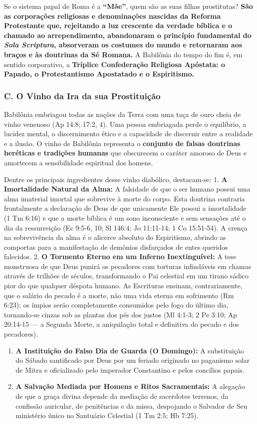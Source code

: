 Se o sistema papal de Roma é a \textbf{``Mãe''}, quem são as suas filhas prostitutas? \textbf{São as corporações religiosas e denominações nascidas da Reforma Protestante que, rejeitando a luz crescente da verdade bíblica e o chamado ao arrependimento, abandonaram o princípio fundamental do \textit{Sola Scriptura}, absorveram os costumes do mundo e retornaram aos braços e às doutrinas da Sé Romana.} A Babilônia do tempo do fim é, em sentido corporativo, a \textbf{Tríplice Confederação Religiosa Apóstata: o Papado, o Protestantismo Apostatado e o Espiritismo.}


\subsubsection*{C. O Vinho da Ira da sua Prostituição}

Babilônia embriagou todas as nações da Terra com uma taça de ouro cheia de vinho venenoso (Ap 14:8; 17:2, 4). Uma pessoa embriagada perde o equilíbrio, a lucidez mental, o discernimento ético e a capacidade de discernir entre a realidade e a ilusão. O vinho de Babilônia representa o \textbf{conjunto de falsas doutrinas heréticas e tradições humanas} que obscurecem o caráter amoroso de Deus e amortecem a sensibilidade espiritual dos homens.

Dentre os principais ingredientes desse vinho diabólico, destacam-se:
1. \textbf{A Imortalidade Natural da Alma:} A falsidade de que o ser humano possui uma alma imaterial imortal que sobrevive à morte do corpo. Esta doutrina contraria frontalmente a declaração de Deus de que unicamente Ele possui a imortalidade (1 Tm 6:16) e que a morte bíblica é um sono inconsciente e sem sensações até o dia da ressurreição (Ec 9:5-6, 10; Sl 146:4; Jo 11:11-14; 1 Co 15:51-54). A crença na sobrevivência da alma é o alicerce absoluto do Espiritismo, abrindo as comportas para a manifestação de demônios disfarçados de entes queridos falecidos.
2. \textbf{O Tormento Eterno em um Inferno Inextinguível:} A tese monstruosa de que Deus punirá os pecadores com torturas infindáveis em chamas através de trilhões de séculos, transformando o Pai celestial em um tirano sádico pior do que qualquer déspota humano. As Escrituras ensinam, contrariamente, que o salário do pecado é a morte, não uma vida eterna em sofrimento (Rm 6:23); os ímpios serão completamente consumidos pelo fogo do último dia, tornando-se cinzas sob as plantas dos pés dos justos (Ml 4:1-3; 2 Pe 3:10; Ap 20:14-15 — a Segunda Morte, a aniquilação total e definitiva do pecado e dos pecadores).
\begin{enumerate}
  \item \textbf{A Instituição do Falso Dia de Guarda (O Domingo):} A substituição do Sábado santificado por Deus por um feriado originado no paganismo solar de Mitra e oficializado pelo imperador Constantino e pelos concílios papais.
  \item \textbf{A Salvação Mediada por Homens e Ritos Sacramentais:} A alegação de que a graça divina depende da mediação de sacerdotes terrenos, da confissão auricular, de penitências e da missa, despojando o Salvador de Seu ministério único no Santuário Celestial (1 Tm 2:5; Hb 7:25).
\end{enumerate}


